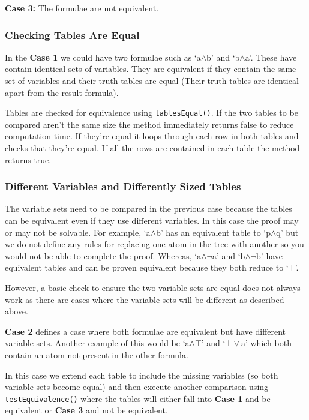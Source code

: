 \documentclass{report}
\begin{document}
\textbf{Case 3: } The formulae are not equivalent.

\subsubsection{Checking Tables Are Equal}

In the \textbf{Case 1} we could have two formulae such as `a$\land$b' and `b$\land$a'. These have contain identical sets of variables. They are equivalent if they contain the same set of variables and their truth tables are equal (Their truth tables are identical apart from the result formula).

Tables are checked for equivalence using {\tt tablesEqual()}. If the two tables to be compared aren't the same size the method immediately returns false to reduce computation time. If they're equal it loops through each row in both tables and checks that they're equal. If all the rows are contained in each table the method returns true.

\subsubsection{Different Variables and Differently Sized Tables}

The variable sets need to be compared in the previous case because the tables can be equivalent even if they use different variables. In this case the proof may or may not be solvable. For example, `a$\land$b' has an equivalent table to `p$\land$q' but we do not define any rules for replacing one atom in the tree with another so you would not be able to complete the proof. Whereas, `a$\land\lnot$a' and `b$\land\lnot$b' have equivalent tables and can be proven equivalent because they both reduce to `$\top$'.

However, a basic check to ensure the two variable sets are equal does not always work as there are cases where the variable sets will be different as described above. 

\textbf{Case 2} defines a case where both formulae are equivalent but have different variable sets. Another example of this would be `a$\land\top$' and `$\bot\lor$a' which both contain an atom not present in the other formula.

In this case we extend each table to include the missing variables (so both variable sets become equal) and then execute another comparison using {\tt testEquivalence()} where the tables will either fall into \textbf{Case 1} and be equivalent or \textbf{Case 3} and not be equivalent. 
\end{document}
